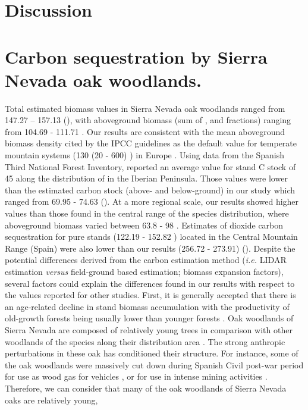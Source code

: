 \section{Discussion}\label{sec:carbon:discussion}
\section{Carbon sequestration by Sierra Nevada oak woodlands.}\label{sec:carbon:discussion-sn}

Total estimated biomass values in Sierra Nevada oak woodlands ranged from 147.27 -- 157.13 \mgha (), with aboveground biomass (sum of \ws, \wb and \wbs fractions) ranging from 104.69 - 111.71 \mgha. Our results are consistent with the mean aboveground biomass density cited by the IPCC guidelines as the default value for temperate mountain systems (130 (20 - 600) \mgha) in Europe \autocite{IPCC2006ForestLand}. Using data from the Spanish Third National Forest Inventory, \citet{Vayredaetal2012SpatialPatterns} reported an average value for stand C stock of 45 \mgha along the distribution of \Qp in the Iberian Peninsula. Those values were lower than the estimated carbon stock (above- and below-ground) in our study which ranged from 69.95 - 74.63 \mgha (). At a more regional scale, our results showed higher values than those found in the central range of the species distribution, where aboveground biomass varied between 63.8 - 98 \mgha \autocite{GallardoLanchoGonzalezHernandez2004SequestrationCarbon}. Estimates of dioxide carbon sequestration for \Qp pure stands (122.19 - 152.82 \mgha) located in the Central Mountain Range (Spain) \autocite{Canellasetal2008SilvicultureCarbon,Canellasetal2017CarbonSequestration} were also lower than our results (256.72 - 273.91) (). Despite the potential differences derived from the carbon estimation method (\emph{i.e.} LIDAR estimation \emph{versus} field-ground based estimation; biomass expansion factors), several factors could explain the differences found in our results with respect to the values reported for other studies. First, it is generally accepted that there is an age‐related decline in stand biomass accumulation \autocite[ and references therein]{Xuetal2012AgerelatedDecline} with the productivity of old-growth forests being usually lower than younger forests \autocite{Kutschetal2009EcophysiologicalCharacteristics}. Oak woodlands of Sierra Nevada are composed of relatively young trees \autocite{GeaIzquierdoCanellas2014LocalClimate,PerezLuqueetal2020LanduseLegacies,RubioCuadradoetal2018AbioticFactors} in comparison with other woodlands of the species along their distribution area \autocite{GeaIzquierdoCanellas2014LocalClimate}. The strong anthropic perturbations in these oak has conditioned their structure. For instance, some of the oak woodlands were massively cut down during Spanish Civil post-war period for use as wood gas for vehicles \autocite[\emph{e.g.} MON population;][]{Prieto1975BosquesSierra}, or for use in intense mining activities \autocite[\emph{e.g.} GEN population;][]{PerezLuqueetal2020LanduseLegacies}. Therefore, we can consider that many of the oak woodlands of Sierra Nevada oaks are relatively young, 